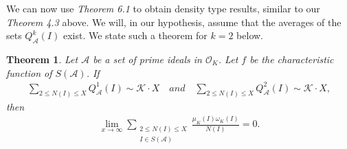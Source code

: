 \documentclass[12pt]{article}
\numberwithin{equation}{section}
\newtheorem{theorem}{Theorem}[section]
\numberwithin{equation}{section}
\begin{document}
\noindent We can now use \textit{Theorem 6.1} to obtain density type results, similar to our \textit{Theorem 4.3} above. We will, in our hypothesis, assume that the averages of the sets $Q_{\mathcal{A}}^k(I)$ exist. We state such a theorem for $k=2$ below.
\begin{theorem}
    Let $\mathcal{A}$ be a set of prime ideals in $\mathcal{O}_K$. Let $f$ be the characteristic function of $S(\mathcal{A})$. If 
    \begin{align}
        \sum_{2\leq N(I)\leq X}Q_{\mathcal{A}}^1(I) \sim \mathcal{K}\cdot X \quad and\quad \sum_{2\leq N(I)\leq X}Q_{\mathcal{A}}^2(I) \sim \mathcal{K}\cdot X ,\nonumber
    \end{align}
    then
    \begin{align}
        \lim_{x\to \infty}\sum_{\substack{2 \leq N(I)\leq X \\ I\in S(\mathcal{A})}} \frac{\mu_K(I)\omega_K(I)}{N(I)} = 0.\nonumber
    \end{align}
\end{theorem}
\end{document}
